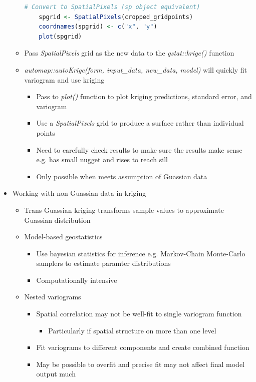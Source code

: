 \documentclass{article}
\begin{document}
\begin{itemize}
\begin{itemize}
\begin{lstlisting}[language=R]
    # Convert to SpatialPixels (sp object equivalent)
    spgrid <- SpatialPixels(cropped_gridpoints)
    coordnames(spgrid) <- c("x", "y")
    plot(spgrid)
\end{lstlisting}

        \item Pass \textit{SpatialPixels} grid as the new data to the \textit{gstat::krige()} function
        \item \textit{automap::autoKrige(form, input\_data, new\_data, model)} will quickly fit variogram and use kriging
        \begin{itemize}
            \item Pass to \textit{plot()} function to plot kriging predictions, standard error, and variogram
            \item Use a \textit{SpatialPixels} grid to produce a surface rather than individual points
            \item Need to carefully check results to make sure the results make sense e.g. has small nugget and rises to reach sill
            \item Only possible when meets assumption of Guassian data
        \end{itemize}
    \end{itemize}
    \item Working with non-Guassian data in kriging
    \begin{itemize}
        \item Trans-Guassian kriging transforms sample values to approximate Guassian distribution
        \item Model-based geostatistics
        \begin{itemize}
            \item Use bayesian statistics for inference e.g. Markov-Chain Monte-Carlo samplers to estimate paramter distributions
            \item Computationally intensive
        \end{itemize}
        \item Nested variograms
        \begin{itemize}
            \item Spatial correlation may not be well-fit to single variogram function
            \begin{itemize}
                \item Particularly if spatial structure on more than one level
            \end{itemize}
            \item Fit variograms to different components and create combined function
            \item May be possible to overfit and precise fit may not affect final model output much
        \end{itemize}
    \end{itemize}
\end{itemize}
\end{document}
